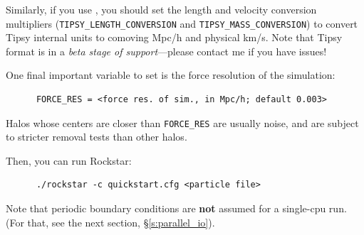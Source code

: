 \documentclass[12pt]{article}
\begin{document}
      Similarly, if you use , you should set the length and velocity
      conversion multipliers (\texttt{TIPSY\_LENGTH\_CONVERSION} and \texttt{TIPSY\_MASS\_CONVERSION})
      to convert Tipsy internal units to comoving Mpc/h and physical km/s.
      Note that Tipsy format is in a \textit{beta stage of support}---please contact
       me if you have issues!
       
       One final important variable to set is the force resolution of the simulation:
\begin{verbatim}
      FORCE_RES = <force res. of sim., in Mpc/h; default 0.003>
\end{verbatim}
	Halos whose centers are closer than \texttt{FORCE\_RES} are usually noise, and are subject to stricter removal tests than other halos.

      Then, you can run Rockstar:
      \begin{verbatim}
      ./rockstar -c quickstart.cfg <particle file>
\end{verbatim}      
      Note that periodic boundary conditions are \textbf{not} assumed for a single-cpu
      run.  (For that, see the next section, \S \ref{s:parallel_io}).
\end{document}
